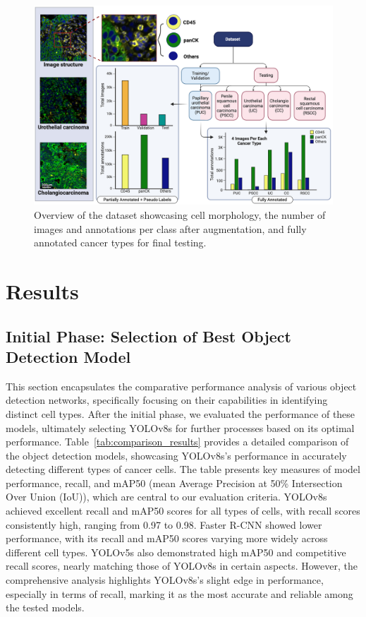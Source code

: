 \documentclass{midl} %
\begin{document}
\begin{figure}[!htbp]
\centering
\includegraphics[width=0.8\linewidth]{images/2.png}
\caption{Overview of the dataset showcasing cell morphology, the number of images and annotations per class after augmentation, and fully annotated cancer types for final testing.}
\label{fig:2}
\end{figure}
\vspace{-1em}

\section{Results}
\subsection{Initial Phase: Selection of Best Object Detection Model}
This section encapsulates the comparative performance analysis of various object detection networks, specifically focusing on their capabilities in identifying distinct cell types. After the initial phase, we evaluated the performance of these models, ultimately selecting YOLOv8s for further processes based on its optimal performance. Table~\ref{tab:comparison_results} provides a detailed comparison of the object detection models, showcasing YOLOv8s's performance in accurately detecting different types of cancer cells. The table presents key measures of model performance, recall, and mAP50 (mean Average Precision at 50\% Intersection Over Union (IoU)), which are central to our evaluation criteria. YOLOv8s achieved excellent recall and mAP50 scores for all types of cells, with recall scores consistently high, ranging from 0.97 to 0.98. Faster R-CNN showed lower performance, with its recall and mAP50 scores varying more widely across different cell types. YOLOv5s also demonstrated high mAP50 and competitive recall scores, nearly matching those of YOLOv8s in certain aspects. However, the comprehensive analysis highlights YOLOv8s's slight edge in performance, especially in terms of recall, marking it as the most accurate and reliable among the tested models.
\end{document}

